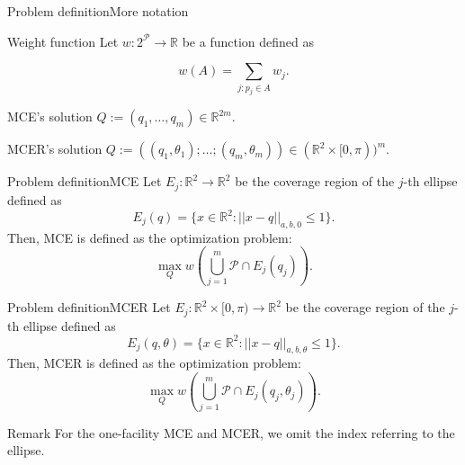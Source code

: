 \documentclass{beamer}
\newcommand{\R}{\mathbb{R}}
\newcommand{\Pp}{\mathscr{P}}
\theoremstyle{definition}
\begin{document}
\begin{frame}{Problem definition}{More notation}
	
	\begin{block}{Weight function}
	Let $w\colon 2^\Pp \to \R$ be a function defined as
	
	\begin{equation*}
	w(A) = \sum_{j \colon p_j \in A} w_j.
	\end{equation*}
	
	\end{block}

\begin{block}{MCE's solution}
	$Q:=(q_1, \dots, q_m) \in \R^{2m}$.
\end{block}

\begin{block}{MCER's solution}
	$Q:=((q_1, \theta_1); \dots; (q_m, \theta_m)) \in (\R^2\times [0, \pi))^m$.
\end{block}
	
\end{frame}

\begin{frame}{Problem definition}{MCE}
	Let $E_j \colon \R^2 \to \R^2$ be the coverage region of the $j$-th ellipse defined as
	\begin{equation*}
	E_j(q) = \{x \in \R^2\colon ||x-q||_{a,b,0} \le 1\}.
	\end{equation*}
	Then, MCE is defined as the optimization problem:
	\begin{equation*}
	\max_{Q}  w\left(\bigcup_{j=1}^m\Pp \cap E_j(q_j)\right).
	\end{equation*}
\end{frame}

\begin{frame}{Problem definition}{MCER}
	Let $E_j \colon \R^2\times[0, \pi) \to \R^2$ be the coverage region of the $j$-th ellipse defined as
	\begin{equation*}
	E_j(q,\theta) = \{x \in \R^2\colon ||x-q||_{a,b,\theta} \le 1\}.
	\end{equation*}
	Then, MCER is defined as the optimization problem:
	\begin{equation*}
	\max_{Q}  w\left(\bigcup_{j=1}^m\Pp \cap E_j(q_j,\theta_j)\right).
	\end{equation*}
	
	\begin{block}{Remark}
		For the one-facility MCE and MCER, we omit the index referring to the ellipse.
	\end{block}
\end{frame}
\end{document}
